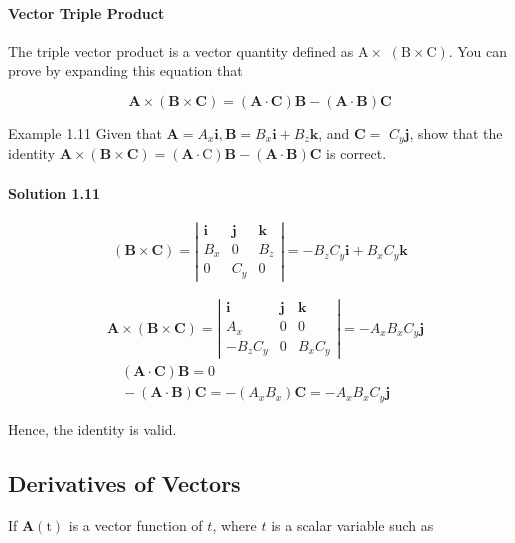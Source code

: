 \documentclass[10pt]{article}
\numberwithin{equation}{section}
\begin{document}
\paragraph{Vector Triple Product}
The triple vector product is a vector quantity defined as $\mathrm{A} \times$ $(\mathrm{B} \times \mathrm{C})$. You can prove by expanding this equation that

$$
\mathbf{A} \times(\mathbf{B} \times \mathbf{C})=(\mathbf{A} \cdot \mathbf{C}) \mathbf{B}-(\mathbf{A} \cdot \mathbf{B}) \mathbf{C}
$$

Example 1.11 Given that $\mathbf{A}=A_{x} \mathbf{i}, \mathbf{B}=B_{x} \mathbf{i}+B_{z} \mathbf{k}$, and $\mathbf{C}=$ $C_{y} \mathbf{j}$, show that the identity $\mathbf{A} \times(\mathbf{B} \times \mathbf{C})=(\mathbf{A} \cdot \mathrm{C}) \mathbf{B}-(\mathbf{A} \cdot \mathbf{B}) \mathbf{C}$ is correct.

\paragraph*{Solution 1.11}
$$
(\mathbf{B} \times \mathbf{C})=\left|\begin{array}{lll}
\mathbf{i} & \mathbf{j} & \mathbf{k} \\
B_{x} & 0 & B_{z} \\
0 & C_{y} & 0
\end{array}\right|=-B_{z} C_{y} \mathbf{i}+B_{x} C_{y} \mathbf{k}
$$

$$
\begin{aligned}
& \mathbf{A} \times(\mathbf{B} \times \mathbf{C})=\left|\begin{array}{lll}
\mathbf{i} & \mathbf{j} & \mathbf{k} \\
A_{x} & 0 & 0 \\
-B_{z} C_{y} & 0 & B_{x} C_{y}
\end{array}\right|=-A_{x} B_{x} C_{y} \mathbf{j} \\
& \quad(\mathbf{A} \cdot \mathbf{C}) \mathbf{B}=0 \\
& \quad-(\mathbf{A} \cdot \mathbf{B}) \mathbf{C}=-\left(A_{x} B_{x}\right) \mathbf{C}=-A_{x} B_{x} C_{y} \mathbf{j}
\end{aligned}
$$

Hence, the identity is valid.

\subsection{Derivatives of Vectors}\label{sec:1-9}
If $\mathbf{A}(\mathrm{t})$ is a vector function of $t$, where $t$ is a scalar variable such as
\end{document}
